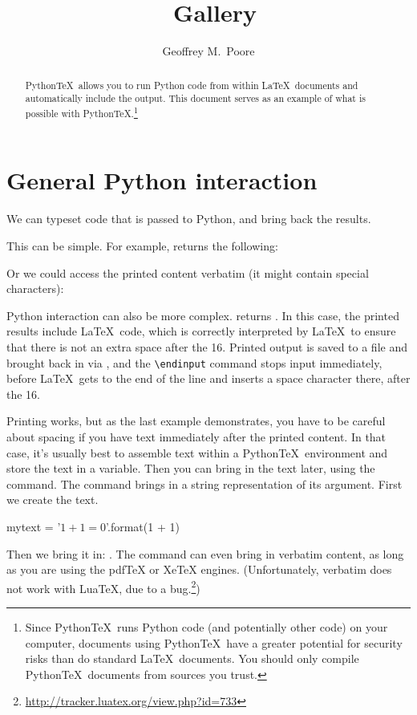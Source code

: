 \documentclass[11pt]{article}
\title{\pytex\ Gallery}
\author{Geoffrey M.\ Poore}
\newcommand{\pytex}{Python\TeX}
\begin{document}
\maketitle


\begin{abstract}
\pytex\ allows you to run Python code from within \LaTeX\ documents and automatically include the output.  This document serves as an example of what is possible with \pytex.\footnote{Since \pytex\ runs Python code (and potentially other code) on your computer, documents using \pytex\ have a greater potential for security risks than do standard \LaTeX\ documents.  You should only compile \pytex\ documents from sources you trust.}
\end{abstract}



\section{General Python interaction}

We can typeset code that is passed to Python, and bring back the results.

This can be simple.  For example,  returns the following:
\begin{quote}
\printpythontex
\end{quote}

Or we could access the printed content verbatim (it might contain special characters):
\begin{quote}
\printpythontex[verb]
\end{quote}

Python interaction can also be more complex.   returns \printpythontex.  In this case, the printed results include \LaTeX\ code, which is correctly interpreted by \LaTeX\ to ensure that there is not an extra space after the 16.  Printed output is saved to a file and brought back in via \verb||, and the \verb|\endinput| command stops input immediately, before \LaTeX\ gets to the end of the line and inserts a space character there, after the 16.

Printing works, but as the last example demonstrates, you have to be careful about spacing if you have text immediately after the printed content.  In that case, it's usually best to assemble text within a \pytex\ environment and store the text in a variable.  Then you can bring in the text later, using the  command.  The  command brings in a string representation of its argument.  First we create the text.
\begin{pyblock}
mytext = '$1 + 1 = {0}$'.format(1 + 1)
\end{pyblock}
Then we bring it in:  .  The  command can even bring in verbatim content, as long as you are using the pdfTeX or XeTeX engines.  (Unfortunately, verbatim does not work with LuaTeX, due to a bug.\footnote{\url{http://tracker.luatex.org/view.php?id=733}})
\end{document}
